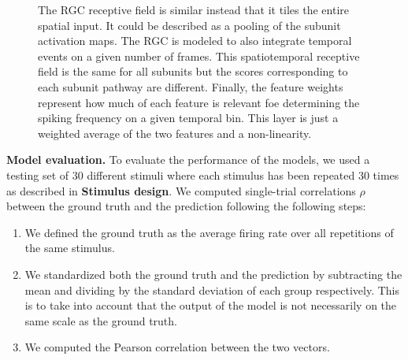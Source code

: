 \begin{figure}
{        The RGC receptive field is similar instead that it tiles the entire
        spatial input. It could be described as a pooling of the subunit
        activation
        maps. The RGC is modeled to also integrate temporal events on a given
        number of frames. This spatiotemporal receptive field is the same for
        all
        subunits but the scores corresponding to each subunit pathway are
        different.
        Finally, the feature weights represent how much of each feature is
        relevant foe
        determining the spiking frequency on a given temporal bin. This layer
        is just
        a weighted average of the two features and a non-linearity.
    }
    \label{fig:CNN_simple}
\end{figure}

\textbf{Model evaluation.}
To evaluate the performance of the models, we used a testing set of 30
different stimuli where each stimulus has been repeated 30 times as described
in \textbf{Stimulus design}.
We computed single-trial correlations $\rho$ between the ground truth and the
prediction following the following steps:
\begin{enumerate}
    \item We defined the ground truth as the average firing rate over all
          repetitions of the same stimulus.
    \item We standardized both the ground truth and the prediction by
          subtracting the mean and dividing by the standard deviation of each group
          respectively. This is to take into account that the output of the model is not
          necessarily on the same scale as the ground truth.
    \item We computed the Pearson correlation between the two vectors.
\end{enumerate}

\clearpage